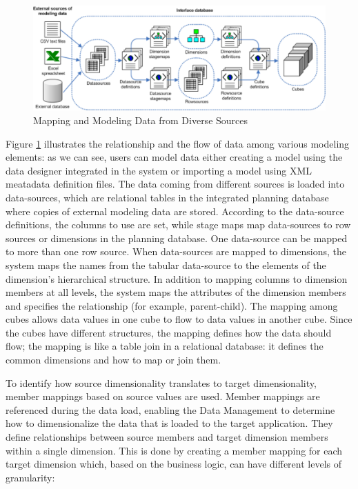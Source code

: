 \documentclass[12pt,a4paper,openright,twoside]{book}
\begin{document}
\begin{figure}[htbp]
	\centering
	\includegraphics[width=\linewidth]{figures/data-mapping.pdf}
	\caption{Mapping and Modeling Data from Diverse Sources}
	\label{fig:mapping}
\end{figure}

Figure \ref{fig:mapping} illustrates the relationship and the flow of data among various modeling elements:
%
as we can see, users can model data either creating a model using the data designer integrated in the system or importing a model using XML meatadata definition files.
%
The data coming from different sources is loaded into data-sources, which are relational tables in the integrated planning database where copies of external modeling data are stored. 
%
According to the data-source definitions, the columns to use are set, while stage maps map data-sources to row sources or dimensions in the planning database. 
%
One data-source can be mapped to more than one row source.
%
When data-sources are mapped to dimensions, the system maps the names from the tabular data-source to the elements of the dimension’s hierarchical structure. 
%
In addition to mapping columns to dimension members at all levels, the system maps the attributes of the dimension members and specifies the relationship (for example, parent-child).
%
The mapping among cubes allows data values in one cube to flow to data values in another cube. 
%
Since the cubes have different structures, the mapping defines how the data should flow; the mapping is like a table join in a relational database: it defines the common dimensions and how to map or join them.

To identify how source dimensionality translates to target dimensionality, member mappings based on source values are used. 
%
Member mappings are referenced during the data load, enabling the Data Management to determine how to dimensionalize the data that is loaded to the target application. 
%
They define relationships between source members and target dimension members within a single dimension. 
%
This is done by creating a member mapping for each target dimension which, based on the business logic, can have different levels of granularity:
\end{document}
